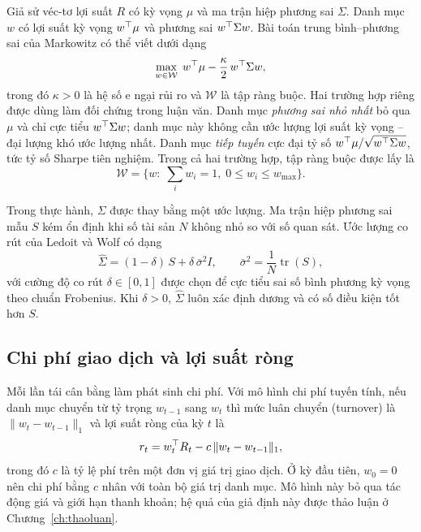 Giả sử véc-tơ lợi suất $R$ có kỳ vọng $\mu$ và ma trận hiệp phương sai $\Sigma$. Danh mục $w$ có lợi suất kỳ vọng $w^{\top}\mu$ và phương sai $w^{\top}\Sigma w$. Bài toán trung bình--phương sai của Markowitz \cite{markowitz1952} có thể viết dưới dạng
\begin{equation}
\max_{w\in\mathcal{W}}\; w^{\top}\mu-\frac{\kappa}{2}\,w^{\top}\Sigma w,
\label{eq:mv}
\end{equation}
trong đó $\kappa>0$ là hệ số e ngại rủi ro và $\mathcal{W}$ là tập ràng buộc. Hai trường hợp riêng được dùng làm đối chứng trong luận văn. Danh mục \emph{phương sai nhỏ nhất} bỏ qua $\mu$ và chỉ cực tiểu $w^{\top}\Sigma w$; danh mục này không cần ước lượng lợi suất kỳ vọng -- đại lượng khó ước lượng nhất. Danh mục \emph{tiếp tuyến} cực đại tỷ số $w^{\top}\mu/\sqrt{w^{\top}\Sigma w}$, tức tỷ số Sharpe tiên nghiệm. Trong cả hai trường hợp, tập ràng buộc được lấy là
\begin{equation}
\mathcal{W}=\{w:\; \textstyle\sum_i w_i=1,\; 0\le w_i\le w_{\max}\}.
\end{equation}

Trong thực hành, $\Sigma$ được thay bằng một ước lượng. Ma trận hiệp phương sai mẫu $S$ kém ổn định khi số tài sản $N$ không nhỏ so với số quan sát. Ước lượng co rút của Ledoit và Wolf \cite{ledoit2004} có dạng
\begin{equation}
\hat\Sigma=(1-\delta)\,S+\delta\,\bar{\sigma}^2 I,\qquad \bar{\sigma}^2=\frac{1}{N}\operatorname{tr}(S),
\label{eq:lw}
\end{equation}
với cường độ co rút $\delta\in[0,1]$ được chọn để cực tiểu sai số bình phương kỳ vọng theo chuẩn Frobenius. Khi $\delta>0$, $\hat\Sigma$ luôn xác định dương và có số điều kiện tốt hơn $S$.

\subsection{Chi phí giao dịch và lợi suất ròng}

Mỗi lần tái cân bằng làm phát sinh chi phí. Với mô hình chi phí tuyến tính, nếu danh mục chuyển từ tỷ trọng $w_{t-1}$ sang $w_t$ thì mức luân chuyển (turnover) là $\lVert w_t-w_{t-1}\rVert_1$ và lợi suất ròng của kỳ $t$ là
\begin{equation}
r_t=w_t^{\top} R_t-c\,\lVert w_t-w_{t-1}\rVert_1,
\label{eq:netret}
\end{equation}
trong đó $c$ là tỷ lệ phí trên một đơn vị giá trị giao dịch. Ở kỳ đầu tiên, $w_{0}=0$ nên chi phí bằng $c$ nhân với toàn bộ giá trị danh mục. Mô hình này bỏ qua tác động giá và giới hạn thanh khoản; hệ quả của giả định này được thảo luận ở Chương~\ref{ch:thaoluan}.

